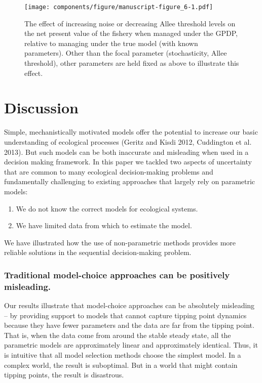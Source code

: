 \documentclass[author-year, 12pt,review]{components/elsarticle} %
\makeatletter
\def\maxwidth{\ifdim\Gin@nat@width>\linewidth\linewidth
\else\Gin@nat@width\fi}
\let\Oldincludegraphics\includegraphics
\renewcommand{\includegraphics}[1]{\Oldincludegraphics[width=\maxwidth]{#1}}
\makeatother
\begin{document}
\begin{figure}[htbp]
\centering
\texttt{[image: components/figure/manuscript-figure\_6-1.pdf]}
\caption{The effect of increasing noise or decreasing Allee threshold
levels on the net present value of the fishery when managed under the
GPDP, relative to managing under the true model (with known parameters).
Other than the focal parameter (stochasticity, Allee threshold), other
parameters are held fixed as above to illustrate this effect.}
\end{figure}

\section{Discussion}\label{discussion}

Simple, mechanistically motivated models offer the potential to increase
our basic understanding of ecological processes (Geritz and Kisdi 2012,
Cuddington et al. 2013). But such models can be both inaccurate and
misleading when used in a decision making framework. In this paper we
tackled two aspects of uncertainty that are common to many ecological
decision-making problems and fundamentally challenging to existing
approaches that largely rely on parametric models:

\begin{enumerate}
\def\labelenumi{\arabic{enumi}.}
\itemsep1pt\parskip0pt
\item
  We do not know the correct models for ecological systems.
\item
  We have limited data from which to estimate the model.
\end{enumerate}

We have illustrated how the use of non-parametric methods provides more
reliable solutions in the sequential decision-making problem.

\subsubsection{Traditional model-choice approaches can be positively
misleading.}\label{traditional-model-choice-approaches-can-be-positively-misleading.}

Our results illustrate that model-choice approaches can be absolutely
misleading -- by providing support to models that cannot capture tipping
point dynamics because they have fewer parameters and the data are far
from the tipping point. That is, when the data come from around the
stable steady state, all the parametric models are approximately linear
and approximately identical. Thus, it is intuitive that all model
selection methods choose the simplest model. In a complex world, the
result is suboptimal. But in a world that might contain tipping points,
the result is disastrous.
\end{document}
